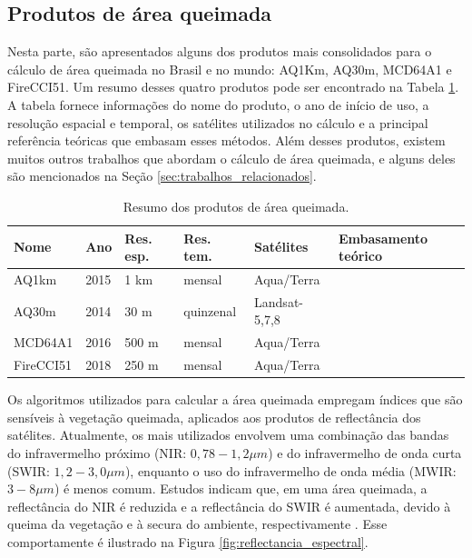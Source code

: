 \documentclass[cic,tc]{iiufrgs}
\begin{document}
\subsection*{Produtos de área queimada}

Nesta parte, são apresentados alguns dos produtos mais consolidados para o cálculo de área queimada no Brasil e no mundo: AQ1Km, AQ30m, MCD64A1 e FireCCI51. Um resumo desses quatro produtos pode ser encontrado na Tabela \ref{table:resumo_produtos_area_queimada}. A tabela fornece informações do nome do produto, o ano de início de uso, a resolução espacial e temporal, os satélites utilizados no cálculo e a principal referência teóricas que embasam esses métodos. Além desses produtos, existem muitos outros trabalhos que abordam o cálculo de área queimada, e alguns deles são mencionados na Seção \ref{sec:trabalhos_relacionados}. 

\begin{table}[htbp]
\centering
\caption{Resumo dos produtos de área queimada.}
\begin{tabular}{ @{}llllll@{} }
  \toprule
  \textbf{Nome} & \textbf{Ano} & \textbf{Res. esp.} & \textbf{Res. tem.} & \textbf{Satélites} & \textbf{Embasamento teórico} \\
  \midrule
  AQ1km & 2015 & 1 km & mensal & Aqua/Terra & \citet{libonati2015algorithm} \\
  AQ30m & 2014 & 30 m & quinzenal & Landsat-5,7,8 & \citet{melchiori2014landsat} \\
  MCD64A1 & 2016  & 500 m & mensal & Aqua/Terra & \citet{GIGLIO201872} \\
  FireCCI51 & 2018 & 250 m & mensal & Aqua/Terra & \citet{Lizundia2020} \\
  \bottomrule
\end{tabular}
\label{table:resumo_produtos_area_queimada}
\end{table}

Os algoritmos utilizados para calcular a área queimada empregam índices que são sensíveis à vegetação queimada, aplicados aos produtos de reflectância dos satélites. Atualmente, os mais utilizados envolvem uma combinação das bandas do infravermelho próximo (NIR: $0,78-1,2\mu m$) e do infravermelho de onda curta (SWIR: $1,2-3,0\mu m$), enquanto o uso do infravermelho de onda média (MWIR: $3-8 \mu m$) é menos comum. Estudos indicam que, em uma área queimada, a reflectância do NIR é reduzida e a reflectância do SWIR é aumentada, devido à queima da vegetação e à secura do ambiente, respectivamente \citep{CHUVIECO201945}. Esse comportamente é ilustrado na Figura \ref{fig:reflectancia_espectral}.
\end{document}
